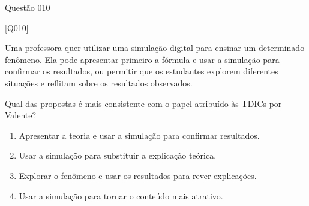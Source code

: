 \documentclass[xcolor=dvipsnames,table]{beamer}
\begin{document}
\begin{frame}{Questão 010}

    \begin{block}{[Q010]}

    Uma professora quer utilizar uma simulação digital para ensinar
    um determinado fenômeno. Ela pode apresentar primeiro a fórmula
    e usar a simulação para confirmar os resultados, ou permitir que
    os estudantes explorem diferentes situações e reflitam sobre
    os resultados observados.

    Qual das propostas é mais consistente com o papel atribuído
    às TDICs por Valente?

    \end{block}

    \begin{enumerate}[label=(\Alph*)]

        \item Apresentar a teoria e usar a simulação para confirmar resultados.       

        \item Usar a simulação para substituir a explicação teórica.
        
		 \item Explorar o fenômeno e usar os resultados para rever explicações.

        \item Usar a simulação para tornar o conteúdo mais atrativo.

    \end{enumerate}

\end{frame}
\end{document}
